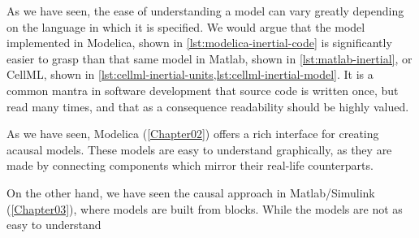 \documentclass[\rootfolder/main.tex]{subfiles}
\begin{document}
As we have seen, the ease of understanding a model can vary greatly depending on the language in which it is specified.
We would argue that the model implemented in Modelica, shown in \cref{lst:modelica-inertial-code} is significantly easier to grasp than that same model in Matlab, shown in \cref{lst:matlab-inertial}, or CellML, shown in \cref{lst:cellml-inertial-units,lst:cellml-inertial-model}. 
It is a common mantra in software development that source code is written once, but read many times, and that as a consequence readability should be highly valued.


As we have seen, Modelica (\cref{Chapter02}) offers a rich interface for creating acausal models.
These models are easy to understand graphically, as they are made by connecting components which mirror their real-life counterparts.

On the other hand, we have seen the causal approach in Matlab/Simulink (\cref{Chapter03}), where models are built from blocks.
While the models are not as easy to understand 
\end{document}
